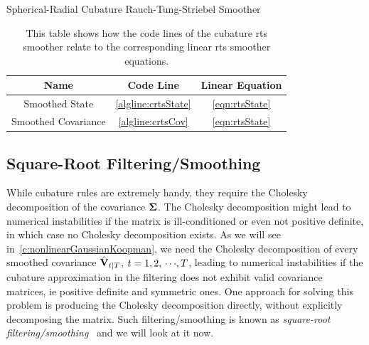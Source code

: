 		\begin{algorithm}  \DontPrintSemicolon
			\caption{Spherical-Radial Cubature Rauch-Tung-Striebel Smoother}
			\label{alg:cubatureRtsSmoother}
		\end{algorithm}
		\begin{table}
			\centering
			\begin{tabular}{c|c|c}
				   \textbf{Name}    &   \textbf{Code Line}    & \textbf{Linear Equation} \\ \hline
				  Smoothed State    & \ref{algline:crtsState} &   \eqref{eqn:rtsState}   \\
				Smoothed Covariance &  \ref{algline:crtsCov}  &   \eqref{eqn:rtsState}
			\end{tabular}
			\caption{This table shows how the code lines of the cubature \ac{rts} smoother relate to the corresponding linear \ac{rts} smoother equations.}
			\label{tab:cubatureRtsSmoother}
		\end{table}

	\subsection{Square-Root Filtering/Smoothing}
		While cubature rules are extremely handy, they require the Cholesky decomposition of the covariance \( \boldsymbol{\mathrm{\Sigma}} \). The Cholesky decomposition might lead to numerical instabilities if the matrix is ill-conditioned or even not positive definite, in which case no Cholesky decomposition exists. As we will see in~\autoref{c:nonlinearGaussianKoopman}, we need the Cholesky decomposition of every smoothed covariance \( \hat{\boldsymbol{\mathrm{V}}}_{t \vert T} \), \( t = 1, 2, \,\cdots\!, T \), leading to numerical instabilities if the cubature approximation in the filtering does not exhibit valid covariance matrices, \ac{ie} positive definite and symmetric ones. One approach for solving this problem is producing the Cholesky decomposition directly, without explicitly decomposing the matrix. Such filtering/smoothing is known as \emph{square-root filtering/smoothing}~\cite{vandermerweSquarerootUnscentedKalman2001,ruttenSquarerootUnscentedFiltering2013} and we will look at it now.

